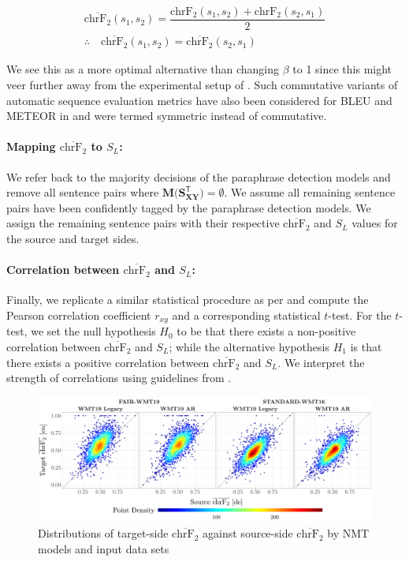 \documentclass[11pt,a4paper]{article}
\begin{document}
\begin{gather}
  \overline{\text{chrF}_2}(s_1,s_2) = \dfrac{\text{chrF}_2(s_1,s_2) + \text{chrF}_2(s_2,s_1)}{2} \\[5pt]
  \therefore \quad \overline{\text{chrF}_2}(s_1,s_2) =
  \overline{\text{chrF}_2}(s_2,s_1)
\end{gather}

We see this as a more optimal alternative than changing $\beta$ to 1 since this
might veer further away from the experimental setup of
\citet{michel2019evaluation}. Such commutative variants of automatic sequence
evaluation metrics have also been considered for BLEU and METEOR in
\citet{wieting-etal-2019-beyond} and were termed symmetric instead of
commutative.

\paragraph{Mapping $\overline{\text{chrF}_2}$ to $S_L$:}
We refer back to the majority decisions of the paraphrase detection models and
remove all sentence pairs where $\mathbf{M(S_{XY}^{\mathsf{T}}}) = \emptyset$.
We assume all remaining sentence pairs have been confidently tagged by the
paraphrase detection models. We assign the remaining sentence pairs with their
respective $\overline{\text{chrF}_2}$ and $S_L$ values for the source and target
sides.

\paragraph{Correlation between $\overline{\text{chrF}_2}$ and $S_L$:} Finally,
we replicate a similar statistical procedure as per \citet{michel2019evaluation}
and compute the Pearson correlation coefficient $r_{xy}$ and a corresponding
statistical $t$-test. For the $t$-test, we set the null hypothesis $H_0$ to be
that there exists a non-positive correlation between $\overline{\text{chrF}_2}$
and $S_L$; while the alternative hypothesis $H_1$ is that there exists a
positive correlation between $\overline{\text{chrF}_2}$ and $S_L$. We interpret
the strength of correlations using guidelines from
\citet{schober2018correlation}.

\begin{figure}
  \centering \includegraphics[trim={0cm 0cm 0cm
    0cm},clip,width=\textwidth]{chrf_nmt.pdf}
  \caption{Distributions of target-side $\overline{\text{chrF}_2}$ against
    source-side $\overline{\text{chrF}_2}$ by NMT models and input data sets}
  \label{chrf_distribution}
\end{figure}
\end{document}
